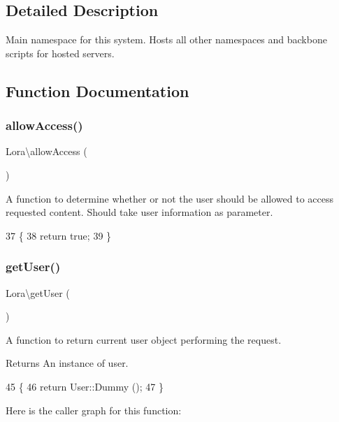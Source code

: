 \subsection{Detailed Description}
Main namespace for this system. Hosts all other namespaces and backbone scripts for hosted servers. 

\subsection{Function Documentation}
\mbox{\label{namespace_lora_a94879a930ed3b8684851ff98e9220a27}} 
\subsubsection{\texorpdfstring{allow\+Access()}{allowAccess()}}
{\footnotesize\ttfamily Lora\textbackslash{}allow\+Access (\begin{DoxyParamCaption}{ }\end{DoxyParamCaption})}

A function to determine whether or not the user should be allowed to access requested content.  Should take user information as parameter. 
\begin{DoxyCode}
37                         \{
38     \textcolor{keywordflow}{return} \textcolor{keyword}{true};
39 \}
\end{DoxyCode}
\mbox{\label{namespace_lora_a881d230aaa8a5510d5c80f0ed1497129}} 
\subsubsection{\texorpdfstring{get\+User()}{getUser()}}
{\footnotesize\ttfamily Lora\textbackslash{}get\+User (\begin{DoxyParamCaption}{ }\end{DoxyParamCaption})}

A function to return current user object performing the request. \begin{DoxyReturn}{Returns}
An instance of user. 
\end{DoxyReturn}

\begin{DoxyCode}
45                     \{
46     \textcolor{keywordflow}{return} User::Dummy ();
47 \}
\end{DoxyCode}
Here is the caller graph for this function\+:
\mbox{\label{namespace_lora_a538956ba5c1427dd64c41ea1cdc5bddb}} 
